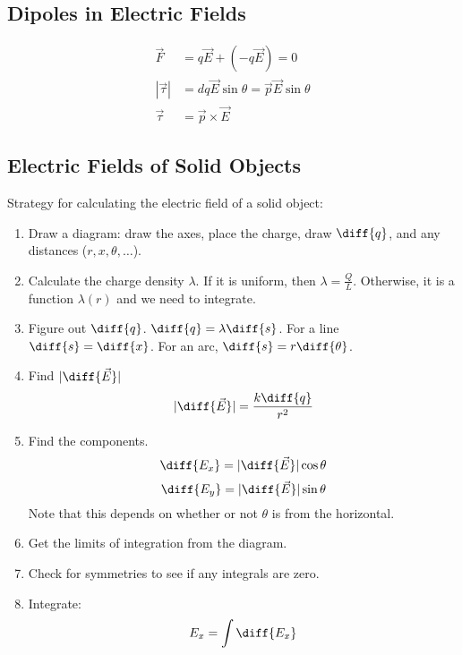 \documentclass{math}
\begin{document}
\subsection*{Dipoles in Electric Fields}
\begin{center}
\end{center}
\begin{align*}
  \vec{F} &= q\vec{E}+(-q\vec{E}) = 0 \\
  |\vec{\tau}| &= dq\vec{E}\sin\theta = \vec{p}\vec{E}\sin\theta \\
  \vec{\tau} &= \vec{p}\times\vec{E}
\end{align*}

\subsection*{Electric Fields of Solid Objects}
Strategy for calculating the electric field of a solid object:
\begin{enumerate}
  \item Draw a diagram: draw the axes, place the charge, draw \( \diff{q} \),
  and any distances (\( r,x,\theta,\dots \)).
  \item Calculate the charge density \( \lambda \). If it is uniform, then
  \( \lambda = \frac{Q}{L} \). Otherwise, it is a function \( \lambda(r) \) and
  we need to integrate.
  \item Figure out \( \diff{q} \). \( \diff{q} = \lambda\diff{s} \). For a line
  \( \diff{s} = \diff{x} \). For an arc, \( \diff{s} = r\diff{\theta} \).
  \item Find \( |\diff{\vec{E}}| \)
  \[ |\diff{\vec{E}}| = \frac{k\diff{q}}{r^2} \]
  \item Find the components.
  \[ \diff{E_x} = |\diff{\vec{E}}|\cos\theta \]
  \[ \diff{E_y} = |\diff{\vec{E}}|\sin\theta \]
  Note that this depends on whether or not \( \theta \) is from the horizontal.
  \item Get the limits of integration from the diagram.
  \item Check for symmetries to see if any integrals are zero.
  \item Integrate:
  \[ E_x = \int\diff{E_x} \]
\end{enumerate}
\end{document}
